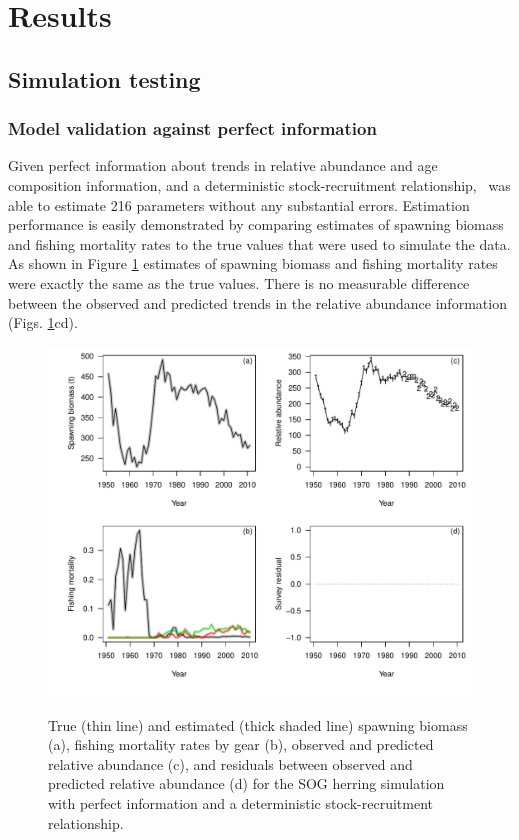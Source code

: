 \section{Results}
	\subsection{Simulation testing}
		\subsubsection{Model validation against perfect information}
	
	Given perfect information about trends in relative abundance and age composition information, and a deterministic stock-recruitment relationship, \iscam\ was able to estimate 216 parameters without any substantial errors.	  Estimation performance is easily demonstrated by comparing estimates of spawning biomass and fishing mortality rates to the true values that were used to simulate the data.  As shown in Figure \ref{FigSimPlot} estimates of spawning biomass and fishing mortality rates were exactly the same as the true values. There is no measurable difference between the observed and predicted trends in the relative abundance information (Figs. \ref{FigSimPlot}cd).
	
\begin{figure}[!tbp]
	\includegraphics[width=\textwidth]{../Figs/simPlot.pdf}\\
	\caption{True (thin line) and estimated (thick shaded line) spawning biomass (a), fishing mortality rates by gear (b), observed and predicted relative abundance (c), and residuals between observed and predicted relative abundance (d) for the SOG herring simulation with perfect information and a deterministic stock-recruitment relationship.}\label{FigSimPlot}
\end{figure}
		
